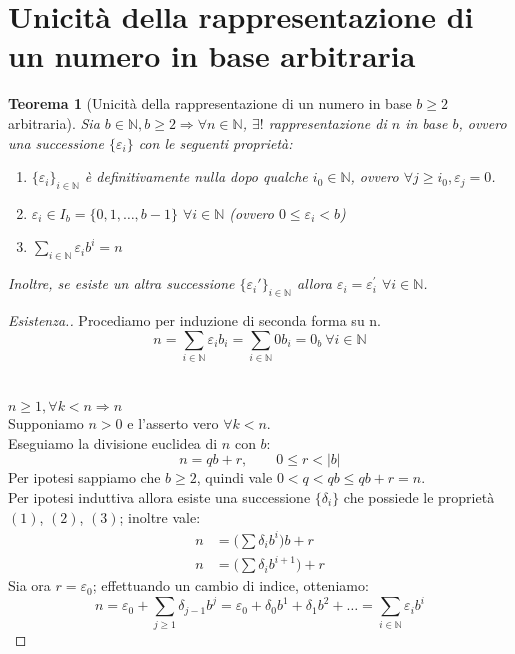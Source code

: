 \documentclass[12pt,twoside]{article}
\newcommand{\N}{\mathbb{N}}
\newcommand{\implica}{\Longrightarrow}
\newcommand{\nin}{\forall n\in\N}
\newcommand{\eps}{\varepsilon}
\newcommand{\pr}{\prime}
\renewcommand\qedsymbol{$\blacksquare$}
\newcommand{\baseinduz}[1]{\newline\newline {\boldmath$n = #1$}}
\newcommand{\induzdue}[1]{\\\\{\boldmath$n \ge #1, \forall k < n \implica n$}}
\newtheorem{theorem}{Teorema}
\begin{document}
\section{Unicità della rappresentazione di un numero in base arbitraria}
\begin{theorem}[Unicità della rappresentazione di un numero in base $b \ge 2$ arbitraria]
Sia $b \in \N, b \ge 2 \implica \nin$, $\exists!$ rappresentazione di $n$ in base $b$, ovvero una successione $\{\eps_{i}\}$ con le seguenti proprietà:
\begin{enumerate}
\item $\{\eps_i\}_{i\in\N}$ è definitivamente nulla dopo qualche $i_{0}\in\N$, ovvero $\forall j \ge i_{0}, \eps_{j} = 0$.
\item $\eps_i \in I_b = \{0, 1,\ldots ,b-1\}$ $\forall i \in \N$ (ovvero $0 \le \eps_i < b$)
\item $\displaystyle\sum_{i\in\N} \eps_{i}b^i = n$
\end{enumerate}
Inoltre, se esiste un altra successione $\{\eps_i'\}_{i\in\N}$ allora $\eps_i = \eps_{i}^{\pr}$ $\forall i \in \N$.
\end{theorem}

\renewcommand\qedsymbol{$\square$}
\begin{proof}[Esistenza.]
Procediamo per induzione di seconda forma su n.
\baseinduz{0}
$$ n = \sum_{i\in\N} \eps_i b_i = \sum_{i\in\N} 0 b_i = 0_b \ \forall i \in\N$$
\induzdue{1}
\\Supponiamo $n > 0$ e l'asserto vero $\forall k < n$.
\\Eseguiamo la divisione euclidea di $n$ con $b$:
$$n = qb + r, \qquad0 \le r < |b|$$
Per ipotesi sappiamo che $b \ge 2$, quindi vale $ 0 < q < qb \le qb + r = n$.
\\Per ipotesi induttiva allora esiste una successione $\{\delta_i\}$ che possiede le proprietà $(1)$, $(2)$, $(3)$; inoltre vale:
\begin{align*}
n &= \Big(\sum \delta_i b^i\Big) b + r\\
n &= \Big(\sum \delta_i b^{i+1}\Big) + r
\end{align*}
Sia ora $r = \eps_0$; effettuando un cambio di indice, otteniamo:
$$ n = \eps_0 + \sum_{j \ge 1} \delta_{j-1}b^j = \eps_0 + \delta_0 b^1 + \delta_1 b^2 + \ldots = \sum_{i\in\N} \eps_i b^i $$
\end{proof}
\end{document}

